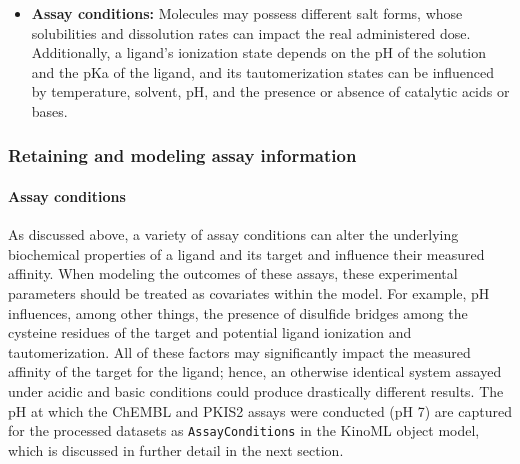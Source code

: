 \documentclass[9pt,lessons, pubversion]{livecoms}
\begin{document}
\begin{itemize}
\item {\bf Assay conditions:} Molecules may possess different salt forms, whose solubilities and dissolution rates can impact the real administered dose. Additionally, a ligand's ionization state depends on the pH of the solution and the pKa of the ligand, and its tautomerization states can be influenced by temperature, solvent, pH, and the presence or absence of catalytic acids or bases.~\cite{lu2021ionization}
\end{itemize}

\subsubsection{Retaining and modeling assay information}

\paragraph{Assay conditions}

As discussed above, a variety of assay conditions can alter the underlying biochemical properties of a ligand and its target and influence their measured affinity. When modeling the outcomes of these assays, these experimental parameters should be treated as covariates within the model. For example, pH influences, among other things, the presence of disulfide bridges among the cysteine residues of the target and potential ligand ionization and tautomerization. All of these factors may significantly impact the measured affinity of the target for the ligand; hence, an otherwise identical system assayed under acidic and basic conditions could produce drastically different results. The pH at which the ChEMBL and PKIS2 assays were conducted (pH 7) are captured for the processed datasets as \texttt{AssayConditions} in the KinoML object model, which is discussed in further detail in the next section.
\end{document}
